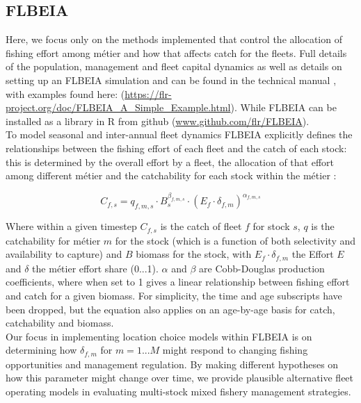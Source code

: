 \documentclass[12pt, halfline, a4paper]{ouparticle}
\begin{document}
\subsection{FLBEIA}

Here, we focus only on the methods implemented that control the allocation of
fishing effort among métier and how that affects catch for the fleets. Full
details of the population, management and fleet capital dynamics as well as
details on setting up an FLBEIA simulation and can be found in the technical
manual \citep{Garcia2017a}, with examples found here:
(\url{https://flr-project.org/doc/FLBEIA_A_Simple_Example.html}). While FLBEIA
can be installed as a library in R from github
(\url{www.github.com/flr/FLBEIA}).\\ 

To model seasonal and inter-annual fleet dynamics FLBEIA explicitly defines the
relationships between the fishing effort of each fleet and the catch of each
stock: this is determined by the overall effort by a fleet, the allocation of
that effort among different métier and the catchability for each stock within
the métier \citep{Garcia2017a}:

\begin{equation}
 C_{f,s} = q_{f,m,s}\cdot B_{s}^{\beta_{f,m,s}} \cdot \left(E_{f}\cdot
	 \delta_{f,m} \right)^{\alpha_{f,m,s}}	
\end{equation}

Where within a given timestep $C_{f,s}$ is the catch of fleet $f$ for stock
$s$, $q$ is the catchability for métier $m$ for the stock (which is a function
of both selectivity and availability to capture) and $B$ biomass for the stock,
with $E_{f}\cdot \delta_{f,m}$ the Effort $E$ and $\delta$ the métier effort
share (0...1). $\alpha$ and $\beta$ are Cobb-Douglas production coefficients,
where when set to 1 gives a linear relationship between fishing effort and
catch for a given biomass. For simplicity, the time and age subscripts have
been dropped, but the equation also applies on an age-by-age basis for catch,
catchability and biomass. \\

Our focus in implementing location choice models within FLBEIA is on
determining how $\delta_{f,m}$ for $m=1...M$ might respond to changing fishing
opportunities and management regulation. By making different hypotheses on how
this parameter might change over time, we provide plausible alternative fleet
operating models in evaluating multi-stock mixed fishery management strategies.
\\
\end{document}
